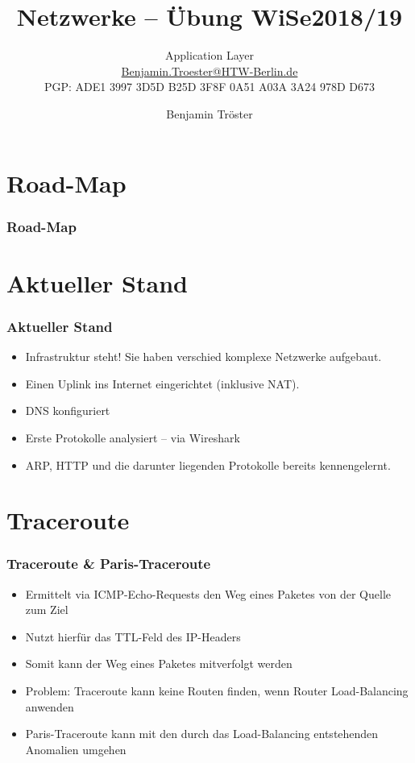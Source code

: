 \documentclass[xcolor=dvipsnames, aspectratio=169]{beamer}
\begin{document}

\title{Netzwerke -- Übung WiSe2018/19}
\subtitle{Application Layer\\
		\href{mailto:Benjamin.Troester@HTW-Berlin.de}{Benjamin.Troester@HTW-Berlin.de}\\
		PGP: ADE1 3997 3D5D B25D 3F8F 0A51 A03A 3A24 978D D673 }
\author{Benjamin Tröster}

\date{}

\begin{frame}
\titlepage

\end{frame}

\section*{Road-Map}
\begin{frame}
\frametitle{Road-Map}
\begin{multicols}{2}
  \tableofcontents
\end{multicols}
\end{frame}

\section{Aktueller Stand}
\begin{frame}
	\frametitle{Aktueller Stand}
	\begin{itemize}
		\item Infrastruktur steht! Sie haben verschied komplexe Netzwerke aufgebaut.
		\item Einen Uplink ins Internet eingerichtet (inklusive NAT).
		\item DNS konfiguriert
		\item Erste Protokolle analysiert -- via Wireshark
		\item ARP, HTTP und die darunter liegenden Protokolle bereits kennengelernt.
	\end{itemize}
\end{frame}

\section{Traceroute}
\begin{frame}
	\frametitle{Traceroute \& Paris-Traceroute}
	\begin{itemize}
		\item Ermittelt via ICMP-Echo-Requests den Weg eines Paketes von der Quelle zum Ziel
		\item Nutzt hierfür das TTL-Feld des IP-Headers
		\item Somit kann der Weg eines Paketes mitverfolgt werden
		\item Problem: Traceroute kann keine Routen finden, wenn Router Load-Balancing anwenden
		\item Paris-Traceroute kann mit den durch das Load-Balancing entstehenden Anomalien umgehen    
	\end{itemize}
\end{frame}
\end{document}
